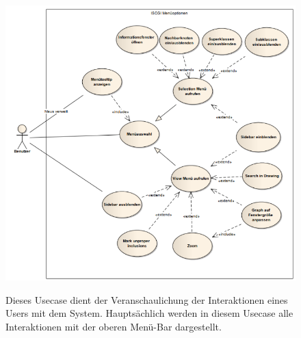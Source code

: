 \documentclass[10pt,a4paper]{article}
\begin{document}
\begin{figure}[htp]
	\begin{center}
		\includegraphics[width=13cm]{Menueoptionen.PNG}\\
	\end{center}
	\caption{Dieses Usecase dient der Veranschaulichung der Interaktionen eines Users mit dem System. Hauptsächlich werden in diesem Usecase alle Interaktionen mit der oberen Menü-Bar dargestellt.}
	\label{fig:figure1}
\end{figure}
\newpage
\end{document}
